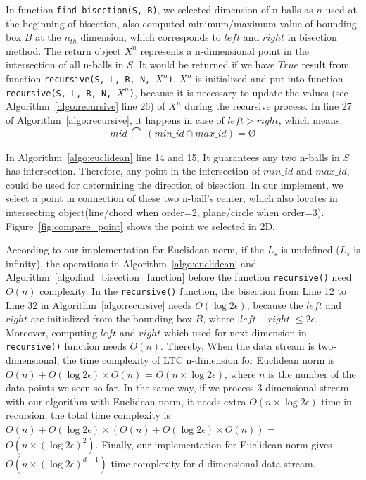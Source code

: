 In function \texttt{find\_bisection(S, B)}, we selected dimension of n-balls as
$n$ used at the beginning of bisection, also computed minimum/maximum value of
bounding box $B$ at the $n_{th}$ dimension, which corresponds to $left$ and
$right$ in bisection method. The return object $X^n$ represents a n-dimensional
point in the intersection of all n-balls in $S$. It would be returned if we have
$True$ result from function \texttt{recursive(S, L, R, N, $X^n$)}. $X^n$ is
initialized and put into function \texttt{recursive(S, L, R, N, $X^n$)}, because
it is necessary to update the values (see Algorithm~\ref{algo:recursive} line
26) of $X^n$ during the recursive process. In line 27 of
Algorithm~\ref{algo:recursive}, it happens in case of $left > right$, which
means:
\begin{equation*}
    mid \  \bigcap \  (min\_id \cap max\_id) = \text{\O}
\end{equation*}

In Algorithm~\ref{algo:euclidean} line 14 and 15, It guarantees any two n-balls
in $S$ has intersection. Therefore, any point in the intersection of $min\_id$
and $max\_id$, could be used for determining the direction of bisection. In our
implement, we select a point in connection of these two n-ball's center, which
also locates in intersecting object(line/chord when order=2, plane/circle when
order=3). Figure~\ref{fig:compare_point} shows the point we selected in 2D.

According to our implementation for Euclidean norm, if the $L_s$ is undefined
($L_s$ is infinity), the operations in Algorithm~\ref{algo:euclidean} and
Algorithm~\ref{algo:find_bisection_function} before the function
\texttt{recursive()} need $O(n)$ complexity. In the \texttt{recursive()}
function, the bisection from Line 12 to Line 32 in
Algorithm~\ref{algo:recursive} needs $O(\log{2\epsilon})$, because the $left$
and $right$ are initialized from the bounding box $B$, where $|left - right|
\leqslant 2\epsilon$. Moreover, computing $left$ and $right$ which used for next
dimension in \texttt{recursive()} function needs $O(n)$. Thereby, When the data
stream is two-dimensional, the time complexity of LTC n-dimension for Euclidean
norm is $O(n) + O(\log{2\epsilon})\times O(n)$ = $O(n \times \log{2\epsilon})$,
where $n$ is the number of the data points we seen so far. In the same way, if
we process 3-dimensional stream with our algorithm with Euclidean norm, it needs
extra $O(n \times \log{2\epsilon})$ time in recursion, the total time complexity
is $O(n) + O(\log{2\epsilon})\times (O(n) + O(\log{2\epsilon})\times O(n))$ =
$O(n\times(\log{2\epsilon})^{2})$. Finally, our implementation for Euclidean
norm gives $O(n\times(\log{2\epsilon})^{d-1})$ time complexity for d-dimensional
data stream.


